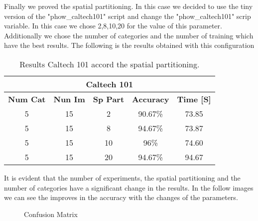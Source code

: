 \documentclass[10pt,twocolumn,letterpaper]{article}
\begin{document}
Finally we proved the spatial partitioning. In this case we decided to use the tiny version of the "phow\_caltech101" script and change the "phow\_caltech101" scrip variable. In this case we chose 2,8,10,20 for the value of this parameter. Additionally we chose the number of categories and the number of training which have the best results. The following is the results obtained with this configuration

\begin{table}[H]
\centering
\caption{Results Caltech 101 accord the spatial partitioning.}
\label{my-label}
\begin{tabular}{|c|c| c| c| c|}
\hline
\multicolumn{5}{|c|}{\textbf{Caltech 101}} \\
\hline 
\cline{1-5}
\textbf {Num Cat} & \textbf { Nun Im}&\textbf { Sp Part} & \textbf {Accuracy} & \textbf { Time [S]}\\
\cline{1-5}
5 & 15 & 2 & 90.67\% & 73.85\\
\cline{1-5}
5 & 15 & 8 & 94.67\% & 73.87  \\
\cline{1-5}
5 & 15 & 10 & 96\% & 74.60  \\
\cline{1-5}
5 & 15 & 20 & 94.67\% & 94.67 \\
\hline
\end{tabular}
\end{table}

It is evident that the number of experiments, the spatial partitioning and the number of categories have a significant change in the results. In the follow images we can see the improves in the accuracy with the changes of the parameters. 

\begin{figure}[H]

  \par
  \par
  \par
  \caption{Confusion Matrix}
\end{figure}
\end{document}
